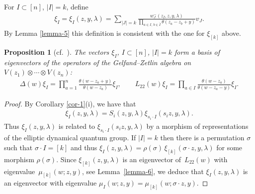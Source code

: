 \documentclass[pdftex]{sigma}
\numberwithin{equation}{section}
\newtheorem{Proposition}[Theorem]{Proposition}
 { \theoremstyle{definition}
\newtheorem{Definition}[Theorem]{Definition}
\newtheorem{Example}[Theorem]{Example}
\newtheorem{Remark}[Theorem]{Remark} }
\begin{document}
For $I\subset[n]$, $|I|=k$, define
\begin{gather}\label{e-xi}
 \xi_I=\xi_I(z,y,\lambda)= \sum_{|J|=k}\frac{w^-_J(z_I,z,y,\lambda)}{\prod\limits_{a\in I,\, b\in\bar I}\theta(z_a-z_b+y)} v_J.
\end{gather}
By Lemma \ref{lemma-5} this definition is consistent with the one for
$\xi_{[k]}$ above.
\begin{Proposition}[{cf.~\cite{GRTV,RTV2,RV2}}]\label{prop-5} The vectors $\xi_I$, $I\subset[n]$, $|I|=k$ form a basis of eigenvectors of the operators of the Gelfand--Zetlin algebra on $V(z_1)\otimes\cdots\otimes V(z_n)$:
 \begin{gather*}
 \Delta(w)\xi_I=\prod_{a=1}^n\frac{\theta(w-z_a+y)}{\theta(w-z_a)} \xi_I, \qquad L_{22}(w)\xi_I= \prod_{a\in I}\frac{\theta(w-z_a)}{\theta(w-z_a-y)} \xi_I.
 \end{gather*}
\end{Proposition}
\begin{proof}
 By Corollary \ref{cor-1}(i), we have that
 \begin{gather*}
 \xi_I(z,y,\lambda) =S_i(z,y,\lambda)\xi_{s_i\cdot I}(s_iz,y,\lambda).
 \end{gather*}
Thus $\xi_I(z,y,\lambda)$ is related to $\xi_{s_i\cdot I}(s_iz,y,\lambda)$ by a morphism of representations of the elliptic dynamical quantum group. If $|I|=k$ then there is a permutation $\sigma$ such that $\sigma\cdot I=[k]$ and thus $\xi_I(z,y,\lambda)=\rho(\sigma)\,\xi_{[k]}(\sigma\cdot z,y,\lambda)$ for some morphism $\rho(\sigma)$. Since $\xi_{[k]}(z,y,\lambda)$ is an eigenvector of~$L_{22}(w)$ with eigenvalue~$\mu_{[k]}(w;z,y)$, see Lemma~\ref{lemma-6}, we deduce that $\xi_I(z,y,\lambda)$ is an eigenvector with eigenvalue $\mu_I(w;z,y)=\mu_{[k]}(w;\sigma\cdot z,y)$.
\end{proof}
\end{document}
